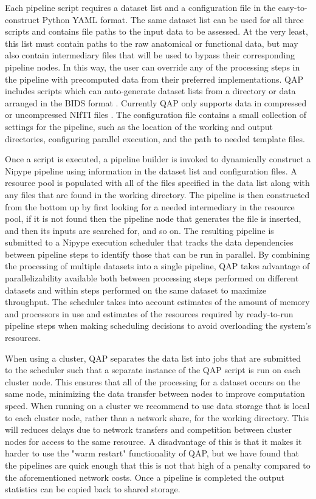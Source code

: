 Each pipeline script requires a dataset list and a configuration file in the easy-to-construct Python YAML format. The same dataset list can be used for all three scripts and contains file paths to the input data to be assessed. At the very least, this list must contain paths to the raw anatomical or functional data, but may also contain intermediary files that will be used to bypass their corresponding pipeline nodes. In this way, the user can override any of the processing steps in the pipeline with precomputed data from their preferred implementations. QAP includes scripts which can auto-generate dataset lists from a directory or data arranged in the BIDS format \citep{gorgolewski_brain_2016}. Currently QAP only supports data in compressed or uncompressed NIfTI files \citep{nifti2004}. The configuration file contains a small collection of settings for the pipeline, such as the location of the working and output directories, configuring parallel execution, and the path to needed template files. 

Once a script is executed, a pipeline builder is invoked to dynamically construct a Nipype pipeline using information in the dataset list and configuration files. A resource pool is populated with all of the files specified in the data list along with any files that are found in the working directory. The pipeline is then constructed from the bottom up by first looking for a needed intermediary in the resource pool, if it is not found then the pipeline node that generates the file is inserted, and then its inputs are searched for, and so on. The resulting pipeline is submitted to a Nipype execution scheduler that tracks the data dependencies between pipeline steps to identify those that can be run in parallel. By combining the processing of multiple datasets into a single pipeline, QAP takes advantage of parallelizability available both between processing steps performed on different datasets and within steps performed on the same dataset to maximize throughput. The scheduler takes into account estimates of the amount of memory and processors in use and estimates of the resources required by ready-to-run pipeline steps when making scheduling decisions to avoid overloading the system's resources.

When using a cluster, QAP separates the data list into jobs that are submitted to the scheduler such that a separate instance of the QAP script is run on each cluster node. This ensures that all of the processing for a dataset occurs on the same node, minimizing the data transfer between nodes to improve computation speed. When running on a cluster we recommend to use data storage that is local to each cluster node, rather than a network share, for the working directory. This will reduces delays due to network transfers and competition between cluster nodes for access to the same resource. A disadvantage of this is that it makes it harder to use the "warm restart" functionality of QAP, but we have found that the pipelines are quick enough that this is not that high of a penalty compared to the aforementioned network costs. Once a pipeline is completed the output statistics can be copied back to shared storage.

